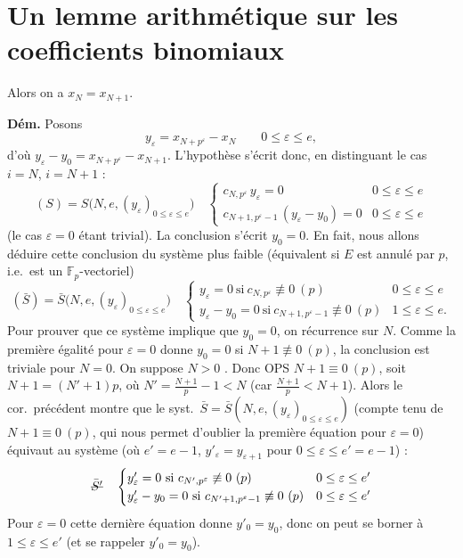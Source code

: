 \documentclass[11pt,a4paper]{article}
\begin{document}
\section{Un lemme arithmétique sur les coefficients binomiaux}


 Alors on a $x_N = x_{N+1}$.

\textbf{Dém.} Posons
\[
  y_\varepsilon = x_{N+p^\varepsilon} - x_N \qquad 0 \leq \varepsilon \leq e ,
\]
d'où $y_\varepsilon - y_0 = x_{N+p^\varepsilon} - x_{N+1}$.
L'hypothèse s'écrit donc, en distinguant le cas $i = N$, $i = N+1$ :
\[
  (S) = S\bigl(N, e, (y_\varepsilon)_{0 \leq \varepsilon \leq e}\bigr)
  \quad
  \begin{cases}
    c_{N, p^\varepsilon}\, y_\varepsilon = 0 & 0 \leq \varepsilon \leq e \\
    c_{N+1, p^\varepsilon - 1}\, (y_\varepsilon - y_0) = 0 & 0 \leq \varepsilon \leq e
  \end{cases}
\]
(le cas $\varepsilon = 0$ étant trivial). La conclusion s'écrit $y_0 = 0$.
En fait, nous allons déduire cette conclusion du système plus faible
(équivalent si $E$ est annulé par $p$, i.e.\ est un $\mathbb{F}_p$-vectoriel)
\[
  (\bar S) = \bar S\bigl(N, e, (y_\varepsilon)_{0 \leq \varepsilon \leq e}\bigr)
  \quad
  \begin{cases}
    y_\varepsilon = 0 \ \text{si}\ c_{N, p^\varepsilon} \not\equiv 0 \ (p) & 0 \leq \varepsilon \leq e \\
    y_\varepsilon - y_0 = 0 \ \text{si}\ c_{N+1, p^\varepsilon - 1} \not\equiv 0 \ (p) & 1 \leq \varepsilon \leq e .
  \end{cases}
\]
Pour prouver que ce système implique que $y_0 = 0$, on  récurrence sur $N$.
Comme la première égalité pour $\varepsilon = 0$ donne $y_0 = 0$ si $N+1 \not\equiv 0 \ (p)$,
la conclusion est triviale pour $N = 0$. \struck{\ill{}} On suppose $N > 0$
. 
Donc OPS $N + 1 \equiv 0 \ (p)$, soit $N+1 = (N'+1)p$, où $N' = \frac{N+1}{p} - 1 < N$
(car $\frac{N+1}{p} < N+1$). Alors le cor.\ précédent montre que le syst.\
$\bar S = \bar S(N, e, (y_\varepsilon)_{0 \leq \varepsilon \leq e})$ (compte tenu de
$N+1 \equiv 0 \ (p)$, qui nous permet d'oublier la première équation pour $\varepsilon = 0$)
équivaut au système (où $e' = e - 1$, $y'_\varepsilon = y_{\varepsilon+1}$ pour
$0 \leq \varepsilon \leq e' = e - 1$) :
\[
  \text{\struck{$\bar S'$}}
  \quad
  \begin{cases}
    y'_\varepsilon = 0 \ \text{si}\ c_{N', p^\varepsilon} \not\equiv 0 \ (p) & 0 \leq \varepsilon \leq e' \\
    y'_\varepsilon - y_0 = 0 \ \text{si}\ c_{N'+1, p^\varepsilon - 1} \not\equiv 0 \ (p) & 0 \leq \varepsilon \leq e'
  \end{cases}
\]
Pour $\varepsilon = 0$ cette dernière équation donne \struck{\ill{}} $y'_0 = y_0$, donc on peut
se borner à $1 \leq \varepsilon \leq e'$ (et se rappeler $y'_0 = y_0$).
\end{document}
